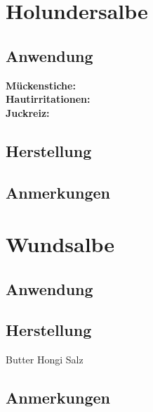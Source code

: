 \section{Holundersalbe}

   

\subsection{Anwendung}

\textbf{Mückenstiche:} \\ 

\textbf{Hautirritationen:} \\ 

\textbf{Juckreiz:} \\ 

\subsection{Herstellung}

\subsection{Anmerkungen}





\section{Wundsalbe}

 

\subsection{Anwendung}

\subsection{Herstellung}

Butter Hongi Salz

\subsection{Anmerkungen}




